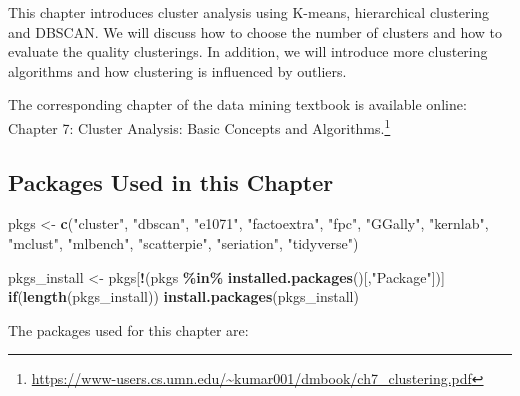 \documentclass[
  notitlepage]{book}
\newenvironment{Shaded}{\begin{snugshade}}{\end{snugshade}}
\newcommand{\ControlFlowTok}[1]{\textcolor[rgb]{0.13,0.29,0.53}{\textbf{#1}}}
\newcommand{\KeywordTok}[1]{\textcolor[rgb]{0.13,0.29,0.53}{\textbf{#1}}}
\newcommand{\NormalTok}[1]{#1}
\newcommand{\OperatorTok}[1]{\textcolor[rgb]{0.81,0.36,0.00}{\textbf{#1}}}
\newcommand{\StringTok}[1]{\textcolor[rgb]{0.31,0.60,0.02}{#1}}
\DeclareRobustCommand{\href}[2]{#2\footnote{\url{#1}}}
\begin{document}
This chapter introduces cluster analysis using K-means, hierarchical clustering
and DBSCAN. We will discuss how to choose the number of clusters and how
to evaluate the quality clusterings. In addition, we will introduce more
clustering algorithms and how clustering is influenced by outliers.

The corresponding chapter of
the data mining textbook is available online:
\href{https://www-users.cs.umn.edu/~kumar001/dmbook/ch7_clustering.pdf}{Chapter 7: Cluster Analysis: Basic Concepts and Algorithms.}

\hypertarget{packages-used-in-this-chapter-5}{%
\subsection*{Packages Used in this Chapter}\label{packages-used-in-this-chapter-5}}

\begin{Shaded}
\begin{Highlighting}[]
\NormalTok{pkgs \textless{}{-}}\StringTok{ }\KeywordTok{c}\NormalTok{(}\StringTok{"cluster"}\NormalTok{, }\StringTok{"dbscan"}\NormalTok{, }\StringTok{"e1071"}\NormalTok{, }\StringTok{"factoextra"}\NormalTok{, }\StringTok{"fpc"}\NormalTok{, }
          \StringTok{"GGally"}\NormalTok{, }\StringTok{"kernlab"}\NormalTok{, }\StringTok{"mclust"}\NormalTok{, }\StringTok{"mlbench"}\NormalTok{, }\StringTok{"scatterpie"}\NormalTok{, }
          \StringTok{"seriation"}\NormalTok{, }\StringTok{"tidyverse"}\NormalTok{)}
  
\NormalTok{pkgs\_install \textless{}{-}}\StringTok{ }\NormalTok{pkgs[}\OperatorTok{!}\NormalTok{(pkgs }\OperatorTok{\%in\%}\StringTok{ }\KeywordTok{installed.packages}\NormalTok{()[,}\StringTok{"Package"}\NormalTok{])]}
\ControlFlowTok{if}\NormalTok{(}\KeywordTok{length}\NormalTok{(pkgs\_install)) }\KeywordTok{install.packages}\NormalTok{(pkgs\_install)}
\end{Highlighting}
\end{Shaded}

The packages used for this chapter are:
\end{document}
